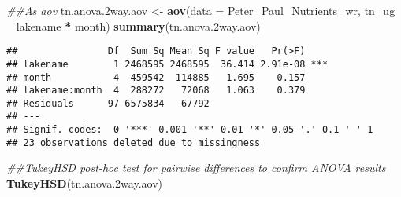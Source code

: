 \documentclass[]{article}
\newenvironment{Shaded}{\begin{snugshade}}{\end{snugshade}}
\newcommand{\CommentTok}[1]{\textcolor[rgb]{0.56,0.35,0.01}{\textit{#1}}}
\newcommand{\DataTypeTok}[1]{\textcolor[rgb]{0.13,0.29,0.53}{#1}}
\newcommand{\FloatTok}[1]{\textcolor[rgb]{0.00,0.00,0.81}{#1}}
\newcommand{\KeywordTok}[1]{\textcolor[rgb]{0.13,0.29,0.53}{\textbf{#1}}}
\newcommand{\NormalTok}[1]{#1}
\newcommand{\OperatorTok}[1]{\textcolor[rgb]{0.81,0.36,0.00}{\textbf{#1}}}
\newcommand{\StringTok}[1]{\textcolor[rgb]{0.31,0.60,0.02}{#1}}
\begin{document}
\begin{Shaded}
\begin{Highlighting}[]
\CommentTok{##As aov}
\NormalTok{tn.anova}\FloatTok{.2}\NormalTok{way.aov <-}\StringTok{ }\KeywordTok{aov}\NormalTok{(}\DataTypeTok{data =}\NormalTok{ Peter_Paul_Nutrients_wr, }
\NormalTok{                         tn_ug }\OperatorTok{~}\StringTok{ }\NormalTok{lakename }\OperatorTok{*}\StringTok{ }\NormalTok{month)}
\KeywordTok{summary}\NormalTok{(tn.anova}\FloatTok{.2}\NormalTok{way.aov)}
\end{Highlighting}
\end{Shaded}

\begin{verbatim}
##                Df  Sum Sq Mean Sq F value   Pr(>F)    
## lakename        1 2468595 2468595  36.414 2.91e-08 ***
## month           4  459542  114885   1.695    0.157    
## lakename:month  4  288272   72068   1.063    0.379    
## Residuals      97 6575834   67792                     
## ---
## Signif. codes:  0 '***' 0.001 '**' 0.01 '*' 0.05 '.' 0.1 ' ' 1
## 23 observations deleted due to missingness
\end{verbatim}

\begin{Shaded}
\begin{Highlighting}[]
\CommentTok{##TukeyHSD post-hoc test for pairwise differences to confirm ANOVA results}
\KeywordTok{TukeyHSD}\NormalTok{(tn.anova}\FloatTok{.2}\NormalTok{way.aov)}
\end{Highlighting}
\end{Shaded}
\end{document}
